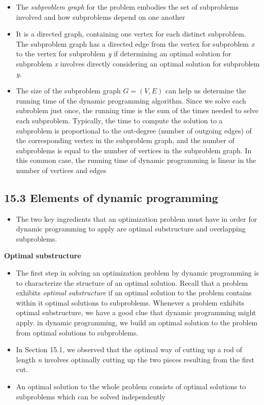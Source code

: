 \documentclass{report}
\begin{document}
\begin{itemize}
    \item The \textit{subproblem graph} for the problem embodies the set of subproblems involved and how subproblems depend on one another
    \item It is a directed graph, containing one vertex for each distinct subproblem. The subproblem graph has a directed edge from the vertex for subproblem \textit{x} to the vertex for subproblem \textit{y} if determining an optimal solution for subproblem \textit{x} involves directly considering an optimal solution for subproblem \textit{y}.
    \item The size of the subproblem graph $G = (V, E)$ can help us determine the running time of the dynamic programming algorithm. Since we solve each subroblem just once, the running time is the sum of the times needed to selve each subproblem. Typically, the time to compute the solution to a subproblem is proportional to the out-degree (number of outgoing edges) of the corresponding vertex in the subproblem graph, and the number of subproblems is equal to the number of vertices in the subproblem graph. In this common case, the running time of dynamic programming is linear in the number of vertices and edges
\end{itemize}

\subsection*{15.3 Elements of dynamic programming}
\begin{itemize}
    \item The two key ingredients that an optimization problem must have in order for dynamic programming to apply are optimal substructure and overlapping subproblems.
\end{itemize}
\textbf{Optimal substructure}
\begin{itemize}
    \item The first step in solving an optimization problem by dynamic programming is to characterize the structure of an optimal solution. Recall that a problem exhibits \textit{optimal substructure} if an optimal solution to the problem contains within it optimal solutions to subproblems. Whenever a problem exhibits optimal substructure, we have a good clue that dynamic programming might apply. in dynamic programming, we build an optimal solution to the problem from optimal solutions to subproblems.
    \item In Section 15.1, we observed that the optimal way of cutting up a rod of length \textit{n} involves optimally cutting up the two pieces resulting from the first cut.
    \item An optimal solution to the whole problem consists of optimal solutions to subproblems which can be solved independently
\end{itemize}
\end{document}
